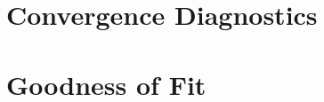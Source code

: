 \section{Convergence Diagnostics} %
\label{sec:convergence_diagnostics}


\section{Goodness of Fit} %
\label{sec:goodness_of_fit}

